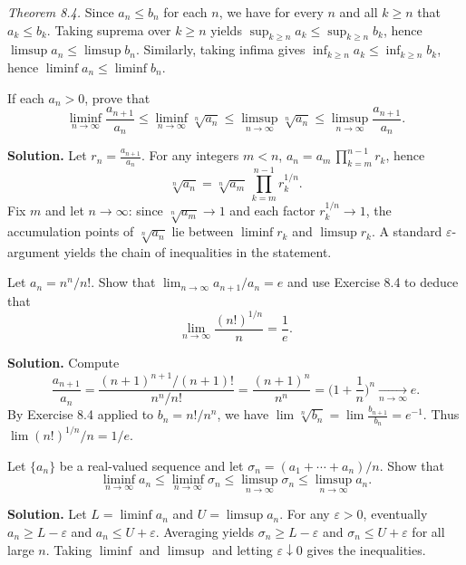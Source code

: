 \emph{Theorem 8.4.} Since \(a_n\le b_n\) for each \(n\), we have for every \(n\) and all \(k\ge n\) that \(a_k\le b_k\). Taking suprema over \(k\ge n\) yields \(\sup_{k\ge n} a_k\le \sup_{k\ge n} b_k\), hence \(\limsup a_n\le \limsup b_n\). Similarly, taking infima gives \(\inf_{k\ge n} a_k\le \inf_{k\ge n} b_k\), hence \(\liminf a_n\le \liminf b_n\).

\begin{problembox}
If each \(a_n > 0\), prove that
\[\liminf_{n \to \infty} \frac{a_{n+1}}{a_n} \leq \liminf_{n \to \infty} \sqrt[n]{a_n} \leq \limsup_{n \to \infty} \sqrt[n]{a_n} \leq \limsup_{n \to \infty} \frac{a_{n+1}}{a_n}.\]
\end{problembox}

\noindent\textbf{Solution.}
Let \(r_n=\frac{a_{n+1}}{a_n}\). For any integers \(m<n\), \(a_n=a_m\,\prod_{k=m}^{n-1} r_k\), hence
\[\sqrt[n]{a_n}=\sqrt[n]{a_m}\, \prod_{k=m}^{n-1} r_k^{1/n}.\]
Fix \(m\) and let \(n\to\infty\): since \(\sqrt[n]{a_m}\to 1\) and each factor \(r_k^{1/n}\to 1\), the accumulation points of \(\sqrt[n]{a_n}\) lie between \(\liminf r_k\) and \(\limsup r_k\). A standard \(\varepsilon\)-argument yields the chain of inequalities in the statement.

\begin{problembox}
Let \(a_n = n^n / n!\). Show that \(\lim_{n \to \infty} a_{n+1} / a_n = e\) and use Exercise 8.4 to deduce that
\[\lim_{n \to \infty} \frac{(n!)^{1/n}}{n} = \frac{1}{e}.\]
\end{problembox}

\noindent\textbf{Solution.}
Compute
\[\frac{a_{n+1}}{a_n}=\frac{(n+1)^{n+1}/(n+1)!}{n^n/n!}=\frac{(n+1)^n}{n^n}=\Big(1+\frac{1}{n}\Big)^n\xrightarrow[n\to\infty]{} e.\]
By Exercise 8.4 applied to \(b_n=n!/n^n\), we have \(\lim \sqrt[n]{b_n}=\lim \frac{b_{n+1}}{b_n}=e^{-1}\). Thus \(\lim (n!)^{1/n}/n=1/e\).

\begin{problembox}
Let \(\{a_n\}\) be a real-valued sequence and let \(\sigma_n = (a_1 + \cdots + a_n)/n\). Show that
\[\liminf_{n \to \infty} a_n \leq \liminf_{n \to \infty} \sigma_n \leq \limsup_{n \to \infty} \sigma_n \leq \limsup_{n \to \infty} a_n.\]
\end{problembox}

\noindent\textbf{Solution.}
Let \(L=\liminf a_n\) and \(U=\limsup a_n\). For any \(\varepsilon>0\), eventually \(a_n\ge L-\varepsilon\) and \(a_n\le U+\varepsilon\). Averaging yields \(\sigma_n\ge L-\varepsilon\) and \(\sigma_n\le U+\varepsilon\) for all large \(n\). Taking \(\liminf\) and \(\limsup\) and letting \(\varepsilon\downarrow 0\) gives the inequalities.


